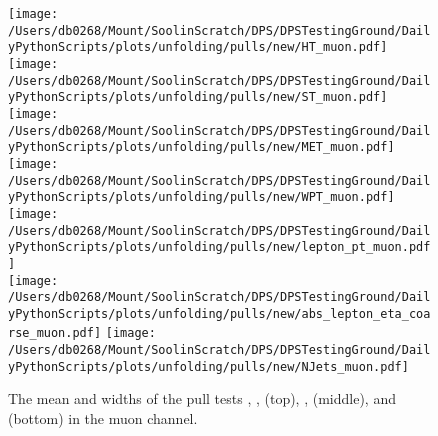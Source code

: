 \begin{figure*}[htpb]
	\centering
	\texttt{[image: /Users/db0268/Mount/SoolinScratch/DPS/DPSTestingGround/DailyPythonScripts/plots/unfolding/pulls/new/HT\_muon.pdf]} 
	\texttt{[image: /Users/db0268/Mount/SoolinScratch/DPS/DPSTestingGround/DailyPythonScripts/plots/unfolding/pulls/new/ST\_muon.pdf]} 
	\texttt{[image: /Users/db0268/Mount/SoolinScratch/DPS/DPSTestingGround/DailyPythonScripts/plots/unfolding/pulls/new/MET\_muon.pdf]} \\
	\texttt{[image: /Users/db0268/Mount/SoolinScratch/DPS/DPSTestingGround/DailyPythonScripts/plots/unfolding/pulls/new/WPT\_muon.pdf]} 
	\texttt{[image: /Users/db0268/Mount/SoolinScratch/DPS/DPSTestingGround/DailyPythonScripts/plots/unfolding/pulls/new/lepton\_pt\_muon.pdf]} \\
	\texttt{[image: /Users/db0268/Mount/SoolinScratch/DPS/DPSTestingGround/DailyPythonScripts/plots/unfolding/pulls/new/abs\_lepton\_eta\_coarse\_muon.pdf]} 
	\texttt{[image: /Users/db0268/Mount/SoolinScratch/DPS/DPSTestingGround/DailyPythonScripts/plots/unfolding/pulls/new/NJets\_muon.pdf]} 
	\caption[The mean and widths of the pull tests \HT{}, \ST{}, \MET{} (top), \WPT{}, \LPT{} (middle), \LETA{} and \NJET{} (bottom) in the muon channel.]{The mean and widths of the pull tests \HT{}, \ST{}, \MET{} (top), \WPT{}, \LPT{} (middle), \LETA{} and \NJET{} (bottom) in the muon channel.}
	\label{fig:Pullsmu}
\end{figure*}
